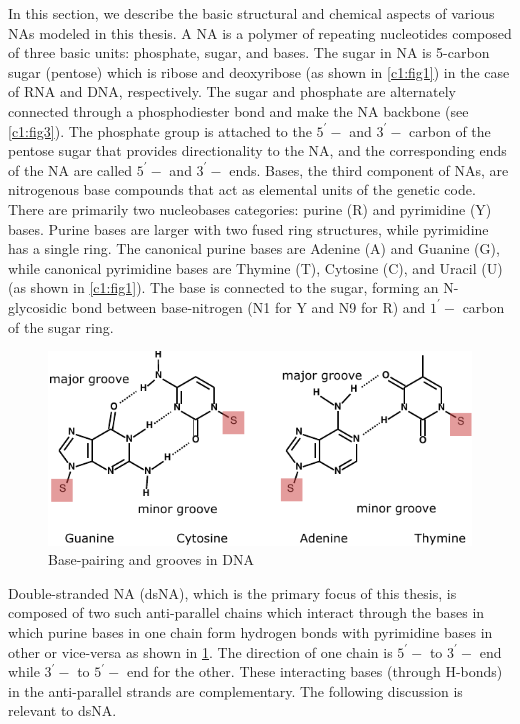In this section, we describe the basic structural and chemical aspects of various NAs modeled in this thesis. 
A NA is a polymer of repeating nucleotides composed of three basic units: phosphate, sugar, and bases.
The sugar in NA is 5-carbon sugar (pentose) which is ribose and deoxyribose (as shown in \cref{c1:fig1}) in the case of RNA and DNA, respectively.
The sugar and phosphate are alternately connected through a phosphodiester bond and make the NA backbone (see \cref{c1:fig3}).
The phosphate group is attached to the $5^\prime-$ and $3^\prime-$ carbon of the pentose sugar that provides directionality to the NA, and the corresponding ends of the NA are called $5^\prime-$ and $3^\prime-$ ends.
Bases, the third component of NAs, are nitrogenous base compounds that act as elemental units of the genetic code. 
There are primarily two nucleobases categories: purine (R) and pyrimidine (Y) bases.
Purine bases are larger with two fused ring structures, while pyrimidine has a single ring.
The canonical purine bases are Adenine (A) and Guanine (G), while canonical pyrimidine bases are Thymine (T),  Cytosine (C), and Uracil (U) (as shown in \cref{c1:fig1}).
The base is connected to the sugar, forming an N-glycosidic bond between base-nitrogen (N1 for Y and N9 for R) and $1^\prime-$ carbon of the sugar ring.

\begin{figure}[htb]
	\begin{center}
	\centering\includegraphics[scale=0.85]{images/base-pair.pdf}
	\centering\caption{Base-pairing and grooves in DNA
	}
\label{c1:fig2}
\end{center}
\end{figure}

Double-stranded NA (dsNA), which is the primary focus of this thesis, is composed of two such anti-parallel chains which
interact through the bases in which purine bases in one chain form hydrogen bonds with pyrimidine bases in other or vice-versa as shown in \cref{c1:fig2}. 
The direction of one chain is $5^\prime-$ to $3^\prime-$ end while $3^\prime-$ to $5^\prime-$ end for the other.
These interacting bases (through H-bonds) in the anti-parallel strands are complementary.
The following discussion is relevant to dsNA.

